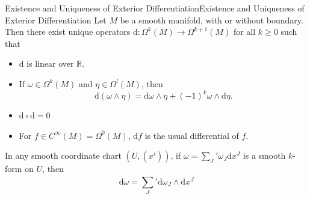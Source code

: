 \documentclass[../main.tex]{subfiles}
\begin{document}
\begin{theorem}{Existence and Uniqueness of Exterior Differentiation}{Existence and Uniqueness of Exterior Differentiation}
  Let $M$ be a smooth manifold, with or without boundary. Then there exist unique operators $\mathrm{d} : \Omega^k(M) \to \Omega^{k+1}(M)$ for all $k \geq 0$ such that
  \begin{itemize}
    \item $\mathrm{d} $ is linear over $\mathbb{R}$.
    \item If $\omega \in \Omega^k(M)$ and $\eta \in \Omega^l(M)$, then
      \begin{equation*}
        \mathrm{d} (\omega \wedge \eta) = \mathrm{d} \omega \wedge \eta + (-1)^k \omega \wedge \mathrm{d} \eta.
      \end{equation*}
    \item $\mathrm{d} \circ \mathrm{d} = 0$
    \item For $f \in C^\infty(M) = \Omega^0(M)$, $\mathrm{d} f$ is the usual differential of $f$.
  \end{itemize}
  In any smooth coordinate chart $(U, (x^i))$, if $\omega = \sum_{J}^{}' \omega_J \mathrm{d} x^J$ is a smooth $k$-form on $U$, then
  \begin{equation}
    \mathrm{d} \omega = \sum_{J}^{}' \mathrm{d} \omega_J \wedge \mathrm{d} x^J
  \end{equation}
\end{theorem}
\end{document}
